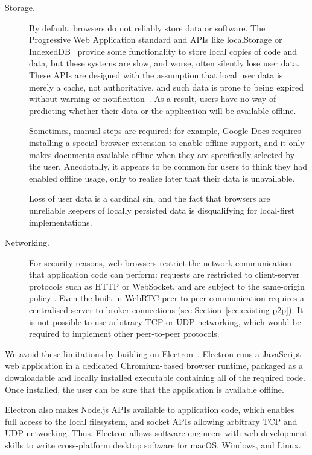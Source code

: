 \documentclass[sigplan,10pt]{acmart}
\begin{document}
\begin{description}

\item[Storage.]
By default, browsers do not reliably store data or software. The Progressive Web Application standard \cite{PWA} and APIs like localStorage or IndexedDB~\cite{IndexedDB} provide some functionality to store local copies of code and data, but these systems are slow, and worse, often silently lose user data. These APIs are designed with the assumption that local user data is merely a cache, not authoritative, and such data is prone to being expired without warning or notification~\cite{LocalStorageCleared,Wilander:2020}.
As a result, users have no way of predicting whether their data or the application will be available offline.

Sometimes, manual steps are required: for example, Google Docs requires installing a special browser extension to enable offline support, and it only makes documents available offline when they are specifically selected by the user. Anecdotally, it appears to be common for users to think they had enabled offline usage, only to realise later that their data is unavailable.

Loss of user data is a cardinal sin, and the fact that browsers are unreliable keepers of locally persisted data is disqualifying for local-first implementations.

\item[Networking.]
For security reasons, web browsers restrict the network communication that application code can perform: requests are restricted to client-server protocols such as HTTP or WebSocket, and are subject to the same-origin policy \cite{SameOrigin}. Even the built-in WebRTC peer-to-peer communication requires a centralised server to broker connections (see Section~\ref{sec:existing-p2p}). It is not possible to use arbitrary TCP or UDP networking, which would be required to implement other peer-to-peer protocols.
\end{description}

We avoid these limitations by building on Electron~\cite{Electron}.
Electron runs a JavaScript web application in a dedicated Chromium-based browser runtime, packaged as a downloadable and locally installed executable containing all of the required code.
Once installed, the user can be sure that the application is available offline.

Electron also makes Node.js APIs available to application code, which enables full access to the local filesystem, and socket APIs allowing arbitrary TCP and UDP networking.
Thus, Electron allows software engineers with web development skills to write cross-platform desktop software for macOS, Windows, and Linux.
\end{document}
